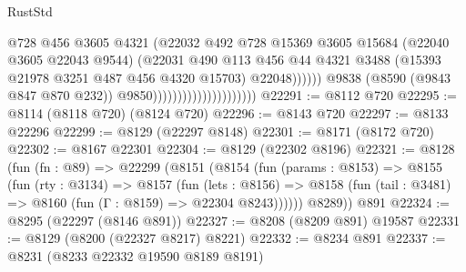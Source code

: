 \begin{lexlean}{RustStd}
\begin{coremodule}
                                                      @728
                                                      @456
                                                      @3605
                                                      @4321
                                                      (@22032
                                                        @492
                                                        @728
                                                        @15369
                                                        @3605
                                                        @15684
                                                        (@22040 @3605 @22043 @9544)
                                                        (@22031
                                                          @490
                                                          @113
                                                          @456
                                                          @44
                                                          @4321
                                                          @3488
                                                          (@15393
                                                            @21978
                                                            @3251
                                                            @487
                                                            @456
                                                            @4320
                                                            @15703)
                                                          @22048))))))
                                              @9838
                                              (@8590 (@9843 @847 @870 @232))
                                              @9850)))))))))))))))))))))
@22291 := @8112 @720
@22295 := @8114 (@8118 @720) (@8124 @720)
@22296 := @8143 @720
@22297 := @8133 @22296
@22299 := @8129 (@22297 @8148)
@22301 := @8171 (@8172 @720)
@22302 := @8167 @22301
@22304 := @8129 (@22302 @8196)
@22321 := @8128
    (fun (fn : @89) =>
    @22299
      (@8151
        (@8154
          (fun (params : @8153) =>
          @8155
            (fun (rty : @3134) =>
            @8157
              (fun (lets : @8156) =>
              @8158 (fun (tail : @3481) => @8160 (fun (Γ : @8159) => @22304 @8243))))))
        @8289))
    @891
@22324 := @8295 (@22297 (@8146 @891))
@22327 := @8208 (@8209 @891) @19587
@22331 := @8129 (@8200 (@22327 @8217) @8221)
@22332 := @8234 @891
@22337 := @8231 (@8233 @22332 @19590 @8189 @8191)

\end{coremodule}
\end{lexlean}
